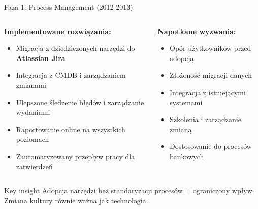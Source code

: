 \documentclass[10pt, aspectratio=169]{beamer}
\begin{document}
\begin{frame}{Faza 1: Process Management (2012-2013)}
\begin{columns}[T]
\begin{column}{0.5\textwidth}
\textbf{Implementowane rozwiązania:}
\begin{itemize}
\item Migracja z dziedziczonych narzędzi do \textbf{Atlassian Jira}
\item Integracja z CMDB i zarządzaniem zmianami
\item Ulepszone śledzenie błędów i zarządzanie wydaniami  
\item Raportowanie online na wszystkich poziomach
\item Zautomatyzowany przepływ pracy dla zatwierdzeń
\end{itemize}
\end{column}
\begin{column}{0.5\textwidth}
\textbf{Napotkane wyzwania:}
\begin{itemize}
\item Opór użytkowników przed adopcją
\item Złożoność migracji danych
\item Integracja z istniejącymi systemami
\item Szkolenia i zarządzanie zmianą
\item Dostosowanie do procesów bankowych
\end{itemize}
\end{column}
\end{columns}

\begin{exampleblock}{Key insight}
Adopcja narzędzi bez standaryzacji procesów = ograniczony wpływ. Zmiana kultury równie ważna jak technologia.
\end{exampleblock}
\end{frame}
\end{document}

